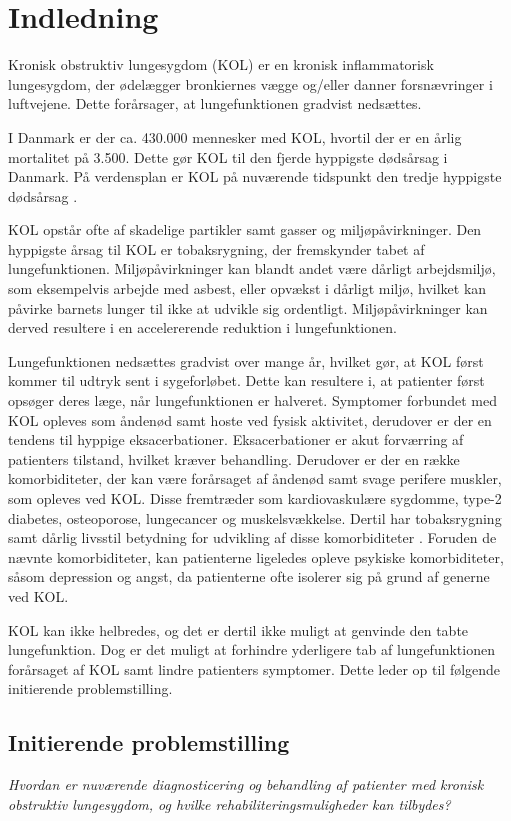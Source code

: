 \chapter{Indledning} 
Kronisk obstruktiv lungesygdom (KOL) er en kronisk inflammatorisk lungesygdom, der ødelægger bronkiernes vægge og/eller danner forsnævringer i luftvejene. Dette forårsager, at lungefunktionen gradvist nedsættes.\cite{Basisbogen2016}

I Danmark er der ca. 430.000 mennesker med KOL, hvortil der er en årlig mortalitet på 3.500. Dette gør KOL til den fjerde hyppigste dødsårsag i Danmark.\cite{Basisbogen2016} På verdensplan er KOL på nuværende tidspunkt den tredje hyppigste dødsårsag \cite{WHO2017}.

KOL opstår ofte af skadelige partikler samt gasser og miljøpåvirkninger. Den hyppigste årsag til KOL er tobaksrygning, der fremskynder tabet af lungefunktionen.\cite{Basisbogen2016,dsam2016,Martinez2016} Miljøpåvirkninger kan blandt andet være dårligt arbejdsmiljø, som eksempelvis arbejde med asbest, eller opvækst i dårligt miljø, hvilket kan påvirke barnets lunger til ikke at udvikle sig ordentligt. Miljøpåvirkninger kan derved resultere i en accelererende reduktion i lungefunktionen.\cite{Martinez2016}

Lungefunktionen nedsættes gradvist over mange år, hvilket gør, at KOL først kommer til udtryk sent i sygeforløbet. Dette kan resultere i, at patienter først opsøger deres læge, når lungefunktionen er halveret.\cite{dsam2016} Symptomer forbundet med KOL opleves som åndenød samt hoste ved fysisk aktivitet, derudover er der en tendens til hyppige eksacerbationer. Eksacerbationer er akut forværring af patienters tilstand, hvilket kræver behandling.\cite{Basisbogen2016,dsam2016}
Derudover er der en række komorbiditeter, der kan være forårsaget af åndenød samt svage perifere muskler, som opleves ved KOL. Disse fremtræder som kardiovaskulære sygdomme, type-2 diabetes, osteoporose, lungecancer og muskelsvækkelse.\cite{dsam2016} Dertil har tobaksrygning samt dårlig livsstil betydning for udvikling af disse komorbiditeter \cite{McCarthy2015}. Foruden de nævnte komorbiditeter, kan patienterne ligeledes opleve psykiske komorbiditeter, såsom depression og angst, da patienterne ofte isolerer sig på grund af generne ved KOL.\cite{dsam2016}

KOL kan ikke helbredes, og det er dertil ikke muligt at genvinde den tabte lungefunktion. Dog er det muligt at forhindre yderligere tab af lungefunktionen forårsaget af KOL samt lindre patienters symptomer.\cite{Basisbogen2016} Dette leder op til følgende initierende problemstilling.


\section{Initierende problemstilling}
\textit{Hvordan er nuværende diagnosticering og behandling af patienter med kronisk obstruktiv lungesygdom, og hvilke rehabiliteringsmuligheder kan tilbydes?}